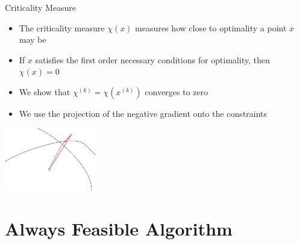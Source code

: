 \documentclass{beamer}
\newcommand{\xk}{{{x}^{(k)}}}
\begin{document}
\begin{frame}{Criticality Measure}
	\begin{itemize}
		\item The criticality measure $\chi\left(x\right)$ measures how close to optimality a point $x$ may be
		\item If $x$ satisfies the first order necessary conditions for optimality, then $\chi(x) = 0$
		\item We show that $\chi^{(k)} = \chi\left(\xk\right)$ converges to zero
		\item We use the projection of the negative gradient onto the constraints
	\end{itemize}
	\begin{center}
		\includegraphics[width=150px]{images/criticality.png}
	\end{center}
\end{frame}











\section{Always Feasible Algorithm}
\end{document}
